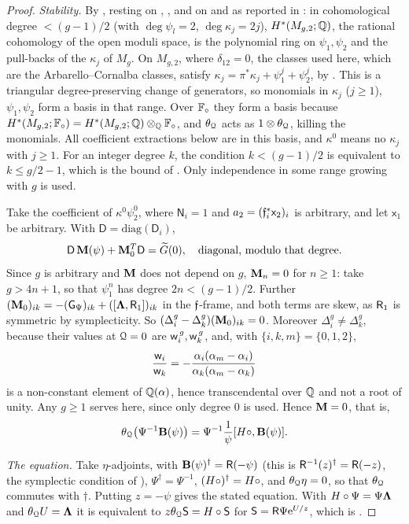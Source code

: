 \begin{proof}
\emph{Stability.} By \cite[2.17--2.19]{Tel12}, resting on \cite[Props.~(2.1), (2.2)]{Loo96}, \cite[Theorem 1.1.1]{MW07}, and on \cite{Har85} and \cite{Iva90} as reported in \cite[Section~1]{Loo96}: in cohomological degree $<(g-1)/2$ (with $\deg\psi_l=2$, $\deg\kappa_j=2j$), $H^*(M_{g,2};\mathbb{Q})$, the rational cohomology of the open moduli space, is the polynomial ring on $\psi_1,\psi_2$ and the pull-backs of the $\kappa_j$ of $M_g$. On $M_{g,2}$, where $\delta_{12}=0$, the classes used here, which are the Arbarello--Cornalba classes, satisfy $\kappa_j=\pi^*\kappa_j+\psi_1^j+\psi_2^j$, by \cite[(2.15)]{Tel12}. This is a triangular degree-preserving change of generators, so monomials in $\kappa_j$ ($j\geq1$), $\psi_1,\psi_2$ form a basis in that range. Over $\mathbb{F}_{\circ}$ they form a basis because $H^*(M_{g,2};\mathbb{F}_{\circ})=H^*(M_{g,2};\mathbb{Q})\otimes_{\mathbb{Q}}\mathbb{F}_{\circ}$, and $\theta_{\mathcal{Q}}$ acts as $1\otimes\theta_{\mathcal{Q}}$, killing the monomials. All coefficient extractions below are in this basis, and $\kappa^0$ means no $\kappa_j$ with $j\geq1$. For an integer degree $k$, the condition $k<(g-1)/2$ is equivalent to $k\leq g/2-1$, which is the bound of \cite{Iva90}. Only independence in some range growing with $g$ is used.

Take the coefficient of $\kappa^0\psi_2^0$, where $\mathsf{N}_i=1$ and $a_2=(\mathfrak{f}_i^*\mathsf{x}_2)_i$ is arbitrary, and let $\mathsf{x}_1$ be arbitrary. With $\mathsf{D}=\mathrm{diag}(\mathsf{D}_i)$,
\[
\mathsf{D}\,\mathbf{M}(\psi)+\mathbf{M}_0^T\mathsf{D}=\widetilde{G}(0),\quad\text{diagonal, modulo that degree.}
\]
Since $g$ is arbitrary and $\mathbf{M}$ does not depend on $g$, $\mathbf{M}_n=0$ for $n\geq1$: take $g>4n+1$, so that $\psi_1^n$ has degree $2n<(g-1)/2$. Further $(\mathbf{M}_0)_{ik}=-(\mathsf{G}_{\Psi})_{ik}+([\mathbf{\Lambda},\mathsf{R}_1])_{ik}$ in the $\mathfrak{f}$-frame, and both terms are skew, as $\mathsf{R}_1$ is symmetric by symplecticity. So $(\Delta_i^g-\Delta_k^g)(\mathbf{M}_0)_{ik}=0$. Moreover $\Delta_i^g\neq\Delta_k^g$, because their values at $\mathcal{Q}=0$ are $\mathsf{w}_i^{\,g},\mathsf{w}_k^{\,g}$, and, with $\{i,k,m\}=\{0,1,2\}$,
\[
\frac{\mathsf{w}_i}{\mathsf{w}_k}=-\frac{\alpha_i(\alpha_m-\alpha_i)}{\alpha_k(\alpha_m-\alpha_k)}
\]
is a non-constant element of $\mathbb{Q}(\alpha)$, hence transcendental over $\mathbb{Q}$ and not a root of unity. Any $g\geq1$ serves here, since only degree $0$ is used. Hence $\mathbf{M}=0$, that is,
\[
\theta_{\mathcal{Q}}\big(\Psi^{-1}\mathbf{B}(\psi)\big)=\Psi^{-1}\frac{1}{\psi}[H\circ,\mathbf{B}(\psi)].
\]

\emph{The equation.} Take $\eta$-adjoints, with $\mathbf{B}(\psi)^{\dagger}=\mathsf{R}(-\psi)$ (this is $\mathsf{R}^{-1}(z)^{\dagger}=\mathsf{R}(-z)$, the symplectic condition of \cite[(5)]{PPZ15}), $\Psi^{\dagger}=\Psi^{-1}$, $(H\circ)^{\dagger}=H\circ$, and $\theta_{\mathcal{Q}}\eta=0$, so that $\theta_{\mathcal{Q}}$ commutes with $\dagger$. Putting $z=-\psi$ gives the stated equation. With $H\circ\Psi=\Psi\mathbf{\Lambda}$ and $\theta_{\mathcal{Q}} U=\mathbf{\Lambda}$ it is equivalent to $z\theta_{\mathcal{Q}}\mathsf{S}=H\circ\mathsf{S}$ for $\mathsf{S}=\mathsf{R}\Psi\mathrm{e}^{U/z}$, which is \cite[(3)]{Giv01}.
\end{proof}

